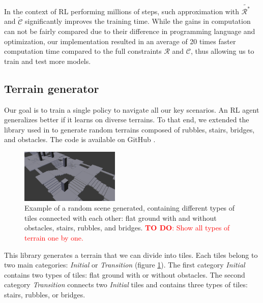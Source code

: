 In the context of RL performing millions of steps, such approximation with $\tilde{\mathcal{R}^*}$ and $\tilde{\mathcal{C}}$ significantly improves the training time. 
While the gains in computation can not be fairly compared due to their difference in programming language and optimization, our implementation resulted in an average of 20 times faster computation time compared to the full constraints $\mathcal{R}$ and $\mathcal{C}$, thus allowing us to train and test more models.


\subsection{Terrain generator\label{subsub:terrain_generator}}
Our goal is to train a single policy to navigate all our key scenarios. 
An RL agent generalizes better if it learns on diverse terrains. 
To that end, we extended the library used in \cite{sl1m_v2} to generate random terrains composed of rubbles, stairs, bridges, and obstacles. The code is available on GitHub \cite{random_scene_gen}.

\begin{figure}
    \centering
    \includegraphics[width=0.42\textwidth]{Figures/Chapter_LEAS/random_scene_tiles_example.png}
    \caption{Example of a random scene generated, containing different types of tiles connected with each other: flat ground with and without obstacles, stairs, rubbles, and bridges. \textcolor{red}{\textbf{TO DO}: Show all types of terrain one by one.}}
    \label{fig:random_scene_gene_tiles_example}
\end{figure}

This library generates a terrain that we can divide into tiles. 
Each tiles belong to two main categories: \textit{Initial} or \textit{Transition} (figure \ref{fig:random_scene_gene_tiles_example}). 
The first category \textit{Initial} contains two types of tiles: flat ground with or without obstacles. 
The second category \textit{Transition} connects two \textit{Initial} tiles and contains three types of tiles: stairs, rubbles, or bridges.

